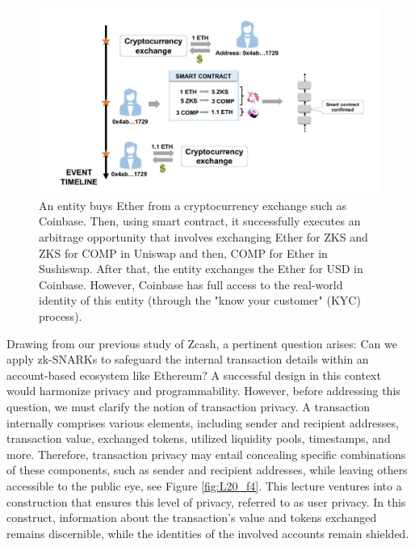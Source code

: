 \begin{center}
	\begin{figure}
		\centering
		\includegraphics[width=0.8\linewidth]{Fig/20/F3}
		\caption{An entity buys Ether from a cryptocurrency exchange such as Coinbase. Then, using smart contract, it successfully executes an arbitrage opportunity that involves exchanging Ether for ZKS and ZKS for COMP in Uniswap and then, COMP for Ether in Sushiswap. After that, the entity exchanges the Ether for USD in Coinbase. However, Coinbase has full access to the real-world  identity of this entity (through the "know your customer" (KYC) process).
		}
		\label{fig:L20_f3}
	\end{figure}
\end{center}
Drawing from our previous study of Zcash, a pertinent question arises: Can we apply zk-SNARKs to safeguard the internal transaction details within an account-based ecosystem like Ethereum? A successful design in this context would harmonize privacy and programmability. However, before addressing this question, we must clarify the notion of transaction privacy. A transaction internally comprises various elements, including sender and recipient addresses, transaction value, exchanged tokens, utilized liquidity pools, timestamps, and more. Therefore, transaction privacy may entail concealing specific combinations of these components, such as sender and recipient addresses, while leaving others accessible to the public eye, see Figure \ref{fig:L20_f4}. This lecture ventures into a construction that ensures this level of privacy, referred to as user privacy. In this construct, information about the transaction's value and tokens exchanged remains discernible, while the identities of the involved accounts remain shielded.

